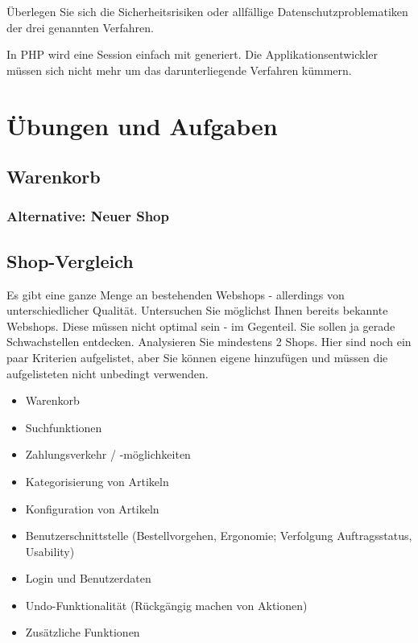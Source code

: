 Überlegen Sie sich die Sicherheitsrisiken oder allfällige Datenschutzproblematiken der
drei genannten Verfahren.

In PHP wird eine Session einfach mit  generiert.
Die Applikationsentwickler müssen sich nicht mehr um das darunterliegende Verfahren kümmern.

\section{Übungen und Aufgaben}
\label{sec:uebungen}

\subsection{Warenkorb}
\label{subsec:wahrenkorb}

\subsubsection*{Alternative: Neuer Shop}

\subsection{Shop-Vergleich}
\label{subsec:shop-vergleich}

Es gibt eine ganze Menge an bestehenden Webshops - allerdings von unterschiedlicher Qualität.
Untersuchen Sie möglichst Ihnen bereits bekannte Webshops. Diese müssen nicht optimal sein -
im Gegenteil. Sie sollen ja gerade Schwachstellen entdecken. Analysieren Sie mindestens 2 Shops.
Hier sind noch ein paar Kriterien aufgelistet, aber Sie können eigene hinzufügen und müssen
die aufgelisteten nicht unbedingt verwenden.

\begin{multicols}{2}
    \begin{itemize}
        \item Warenkorb
        \item Suchfunktionen
        \item Zahlungsverkehr / -möglichkeiten
        \item Kategorisierung von Artikeln
        \item Konfiguration von Artikeln
        \item Benutzerschnittstelle (Bestellvorgehen, Ergonomie; Verfolgung Auftragsstatus, Usability)
        \item Login und Benutzerdaten
        \item Undo-Funktionalität (Rückgängig machen von Aktionen)
        \item Zusätzliche Funktionen
    \end{itemize}
\end{multicols}

